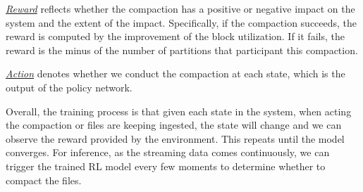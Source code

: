 \noindent \underline{\textit{Reward}}  reflects whether the compaction  has a positive or negative impact on the system and the extent of the impact. Specifically, if the compaction succeeds, the reward is  computed by the improvement of the block utilization. If it fails, the reward is the minus of the number of partitions that participant this compaction.

\noindent \underline{\textit{Action}} denotes whether we conduct the compaction at each state, which is the output of the policy network.

Overall, the training process is that given each state in the system, when acting the compaction or files are keeping ingested, the state will change and we can observe the reward provided by the environment. This repeats until the model converges. For inference, as the streaming data comes continuously, we can trigger the trained RL model every few moments to determine whether to  compact the files.





